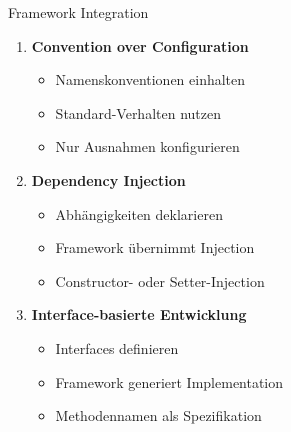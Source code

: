\columnbreak

\begin{KR}{Framework Integration}
\begin{enumerate}
    \item \textbf{Convention over Configuration}
    \begin{itemize}
        \item Namenskonventionen einhalten
        \item Standard-Verhalten nutzen
        \item Nur Ausnahmen konfigurieren
    \end{itemize}
    
    \item \textbf{Dependency Injection}
    \begin{itemize}
        \item Abhängigkeiten deklarieren
        \item Framework übernimmt Injection
        \item Constructor- oder Setter-Injection
    \end{itemize}
    
    \item \textbf{Interface-basierte Entwicklung}
    \begin{itemize}
        \item Interfaces definieren
        \item Framework generiert Implementation
        \item Methodennamen als Spezifikation
    \end{itemize}
\end{enumerate}
\end{KR}




